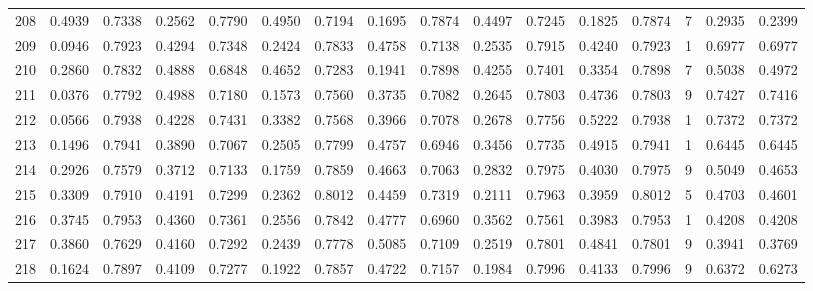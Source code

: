 \begin{tabular}{lrrrrrrrrrrrrrrr}
208 &      0.4939 &  0.7338 &  0.2562 &  0.7790 &  0.4950 &  0.7194 &  0.1695 &  0.7874 &  0.4497 &  0.7245 &   0.1825 &     0.7874 &      7 &                    0.2935 &                     0.2399 \\
209 &      0.0946 &  0.7923 &  0.4294 &  0.7348 &  0.2424 &  0.7833 &  0.4758 &  0.7138 &  0.2535 &  0.7915 &   0.4240 &     0.7923 &      1 &                    0.6977 &                     0.6977 \\
210 &      0.2860 &  0.7832 &  0.4888 &  0.6848 &  0.4652 &  0.7283 &  0.1941 &  0.7898 &  0.4255 &  0.7401 &   0.3354 &     0.7898 &      7 &                    0.5038 &                     0.4972 \\
211 &      0.0376 &  0.7792 &  0.4988 &  0.7180 &  0.1573 &  0.7560 &  0.3735 &  0.7082 &  0.2645 &  0.7803 &   0.4736 &     0.7803 &      9 &                    0.7427 &                     0.7416 \\
212 &      0.0566 &  0.7938 &  0.4228 &  0.7431 &  0.3382 &  0.7568 &  0.3966 &  0.7078 &  0.2678 &  0.7756 &   0.5222 &     0.7938 &      1 &                    0.7372 &                     0.7372 \\
213 &      0.1496 &  0.7941 &  0.3890 &  0.7067 &  0.2505 &  0.7799 &  0.4757 &  0.6946 &  0.3456 &  0.7735 &   0.4915 &     0.7941 &      1 &                    0.6445 &                     0.6445 \\
214 &      0.2926 &  0.7579 &  0.3712 &  0.7133 &  0.1759 &  0.7859 &  0.4663 &  0.7063 &  0.2832 &  0.7975 &   0.4030 &     0.7975 &      9 &                    0.5049 &                     0.4653 \\
215 &      0.3309 &  0.7910 &  0.4191 &  0.7299 &  0.2362 &  0.8012 &  0.4459 &  0.7319 &  0.2111 &  0.7963 &   0.3959 &     0.8012 &      5 &                    0.4703 &                     0.4601 \\
216 &      0.3745 &  0.7953 &  0.4360 &  0.7361 &  0.2556 &  0.7842 &  0.4777 &  0.6960 &  0.3562 &  0.7561 &   0.3983 &     0.7953 &      1 &                    0.4208 &                     0.4208 \\
217 &      0.3860 &  0.7629 &  0.4160 &  0.7292 &  0.2439 &  0.7778 &  0.5085 &  0.7109 &  0.2519 &  0.7801 &   0.4841 &     0.7801 &      9 &                    0.3941 &                     0.3769 \\
218 &      0.1624 &  0.7897 &  0.4109 &  0.7277 &  0.1922 &  0.7857 &  0.4722 &  0.7157 &  0.1984 &  0.7996 &   0.4133 &     0.7996 &      9 &                    0.6372 &                     0.6273 \\

\end{tabular}
